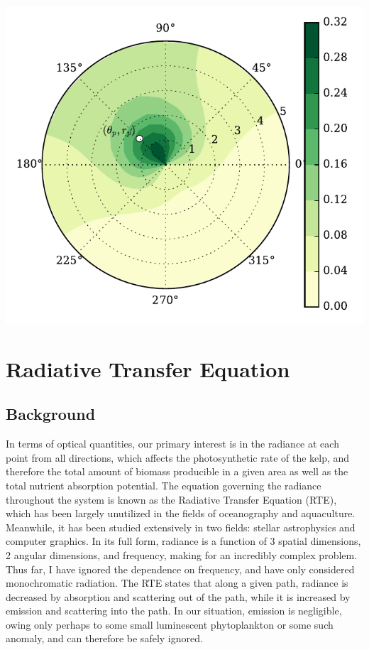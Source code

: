 \documentclass[10pt]{article}
\newenvironment{mcfig}
	{\par\medskip\noindent\minipage{\linewidth}}
	{\endminipage\par\medskip}
\begin{document}
\begin{multicols}{2}
\begin{mcfig}
	\centering
	\includegraphics[width=\linewidth]{prob_shade}
	\vspace{-2em}
	\label{fig:prob_shade}
\end{mcfig}

\section{Radiative Transfer Equation}
\subsection{Background}
In terms of optical quantities, our primary interest is in the radiance at each point from all directions, which affects the photosynthetic rate of the kelp, and therefore the total amount of biomass producible in a given area as well as the total nutrient absorption potential.
The equation governing the radiance throughout the system is known as the Radiative Transfer Equation (RTE), which has been largely unutilized in the fields of oceanography and aquaculture.
Meanwhile, it has been studied extensively in two fields: stellar astrophysics and computer graphics.
In its full form, radiance is a function of 3 spatial dimensions, 2 angular dimensions, and frequency, making for an incredibly complex problem.
Thus far, I have ignored the dependence on frequency, and have only considered monochromatic radiation.
The RTE states that along a given path, radiance is decreased by absorption and scattering out of the path, while it is increased by emission and scattering into the path.
In our situation, emission is negligible, owing only perhaps to some small luminescent phytoplankton or some such anomaly, and can therefore be safely ignored.

\end{multicols}
\end{document}
